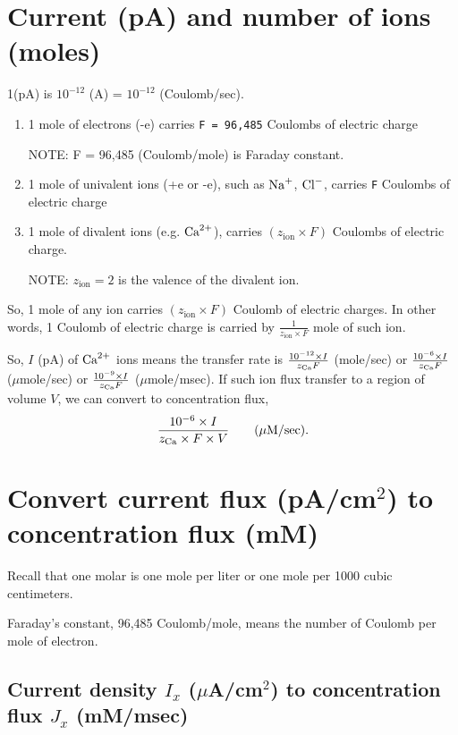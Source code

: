 \section{Current (pA) and number of ions (moles)}

1(pA) is $10^{-12}$ (A) = $10^{-12}$ (Coulomb/sec).

\begin{enumerate}
  \item 1 mole of electrons (-e) carries \verb!F = 96,485! Coulombs of electric
  charge
  
NOTE: F = 96,485 (Coulomb/mole) is Faraday constant.
  
  \item 1 mole of univalent ions (+e or -e), such as ${\text{Na}^+}$, ${\text{Cl}^-}$, carries
  \verb!F! Coulombs of electric charge
  
  \item 1 mole of divalent ions (e.g. ${\text{Ca}^{2+}}$), carries $(z_\text{ion} \times F)$
  Coulombs of electric charge.
  
NOTE: $z_\text{ion}=2$ is the valence of the divalent ion.
\end{enumerate}

So, 1 mole of any ion carries $(z_\text{ion}\times F)$ Coulomb of electric
charges.
In other words, 1 Coulomb of electric charge is carried by
$\frac{1}{z_\text{ion} \times F}$ mole of such ion.

So, $I$ (pA) of ${\text{Ca}^{2+}}$ ions means the transfer rate is
$\frac{10^{-12}\times I}{z_{\text{Ca}} F}$ (mole/sec) or $\frac{10^{-6}\times I}{z_{\text{Ca}} F}$ ($\mu$mole/sec)
or $\frac{10^{-9}\times I}{z_{\text{Ca}} F}$ ($\mu$mole/msec).
If such ion flux transfer to a region of volume $V$, we can convert to
concentration flux, 
\begin{equation}
\frac{10^{-6}\times I}{z_{\text{Ca}} \times F \times V} \qquad \text{($\mu$M/sec).}
\end{equation}


\section{Convert current flux (pA/cm$^2$) to concentration flux (mM)}
\label{sec:convert-current-density-to-concentration}

Recall that one molar is one mole per liter or one mole per 1000 cubic
centimeters.

Faraday's constant, 96,485 Coulomb/mole, means the number of Coulomb per mole of
electron.

\subsection{Current density $I_x$ ($\mu$A/cm$^2$) to concentration flux $J_x$
(mM/msec)}

